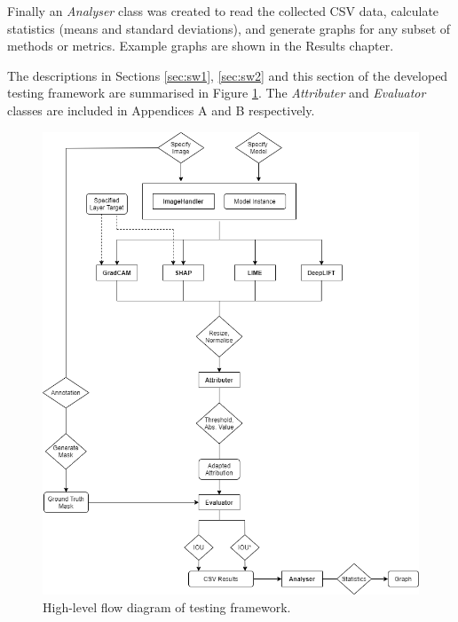 \documentclass[main]{subfiles}
\begin{document}
Finally an \textit{Analyser} class was created to read the collected CSV data, calculate statistics (means and standard deviations), and generate graphs for any subset of methods or metrics. Example graphs are shown in the Results chapter.

The descriptions in Sections \ref{sec:sw1}, \ref{sec:sw2} and this section of the developed testing framework are summarised in Figure \ref{flow_image}. The \textit{Attributer} and \textit{Evaluator} classes are included in Appendices A and B respectively.


\begin{figure}[htbp]
\centering
\includegraphics[scale=0.6]{program_flow.png}
\caption{High-level flow diagram of testing framework.}
\label{flow_image}
\end{figure}
\end{document}
